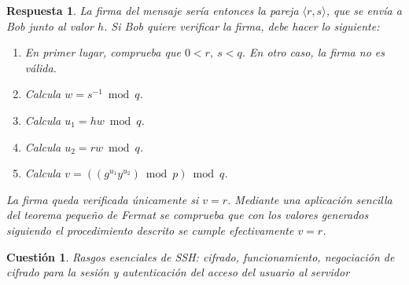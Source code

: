 \documentclass[
  a4paper,
  spanish,
  12pt,
]{scrartcl}
\theoremstyle{ejercicio-style}
\newtheorem{ejer}{Cuestión}
\theoremstyle{remark-style}
\newtheorem*{sol}{Respuesta}
\theoremstyle{teorema-style}
\begin{document}
\begin{sol}
  La firma del mensaje sería entonces la pareja $\langle r, s \rangle$, que se envía a Bob junto al valor $h$. Si Bob quiere verificar la firma, debe hacer lo siguiente:
  \begin{enumerate}
      \item En primer lugar, comprueba que $0 < r,\ s < q$. En otro caso, la firma no es válida.
      \item Calcula $w=s^{-1} \bmod q$.
      \item Calcula $u_1 = hw \bmod q$.
      \item Calcula $u_2 = rw \bmod q$.
      \item Calcula $v = ((g^{u_1}y^{u_2}) \bmod p) \bmod q$.
  \end{enumerate}

  La firma queda verificada únicamente si $v=r$. Mediante una aplicación sencilla del \textit{teorema pequeño de Fermat} se comprueba que con los valores generados siguiendo el procedimiento descrito se cumple efectivamente $v=r$.
\end{sol}

\begin{ejer}
  Rasgos esenciales de SSH: cifrado, funcionamiento, negociación de cifrado para la sesión y autenticación del acceso del usuario al servidor
\end{ejer}
\end{document}
